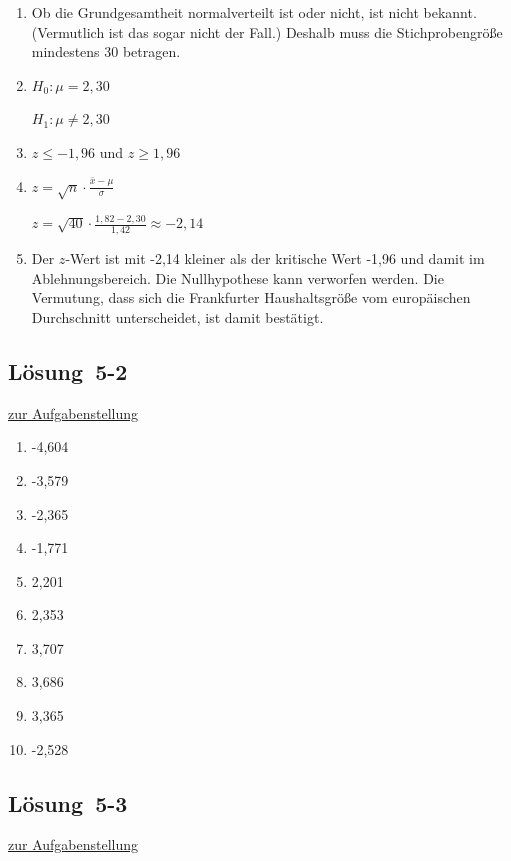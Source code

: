 \documentclass[
  11pt,
  ngerman,
  a4paper,
]{report}
\providecommand{\tightlist}{%
  \setlength{\itemsep}{0pt}\setlength{\parskip}{0pt}}
\begin{document}
\begin{enumerate}
\def\labelenumi{\alph{enumi})}
\item
  Ob die Grundgesamtheit normalverteilt ist oder nicht, ist nicht bekannt. (Vermutlich ist das sogar nicht der Fall.) Deshalb muss die Stichprobengröße mindestens 30 betragen.
\item
  \(H_0 : \mu = 2{,}30\)

  \(H_1 : \mu \neq 2{,}30\)
\item
  \(z \leq -1{,}96\) und \(z \geq 1{,}96\)
\item
  \(z=\sqrt{n}\cdot\frac{\bar{x}-\mu}{\sigma}\)

  \(z=\sqrt{40}\cdot\frac{1{,}82-2{,}30}{1{,}42}\approx-2{,}14\)
\item
  Der \(z\)-Wert ist mit -2,14 kleiner als der kritische Wert -1,96 und damit im Ablehnungsbereich. Die Nullhypothese kann verworfen werden. Die Vermutung, dass sich die Frankfurter Haushaltsgröße vom europäischen Durchschnitt unterscheidet, ist damit bestätigt.
\end{enumerate}

\hypertarget{loesung-5-2}{%
\subsection{Lösung~5-2}\label{loesung-5-2}}

\protect\hyperlink{aufgabe-5-2}{zur Aufgabenstellung}

\begin{enumerate}
\def\labelenumi{\alph{enumi})}
\tightlist
\item
  -4,604
\item
  -3,579
\item
  -2,365
\item
  -1,771
\item
  2,201
\item
  2,353
\item
  3,707
\item
  3,686
\item
  3,365
\item
  -2,528
\end{enumerate}

\hypertarget{loesung-5-3}{%
\subsection{Lösung~5-3}\label{loesung-5-3}}

\protect\hyperlink{aufgabe-5-3}{zur Aufgabenstellung}
\end{document}
